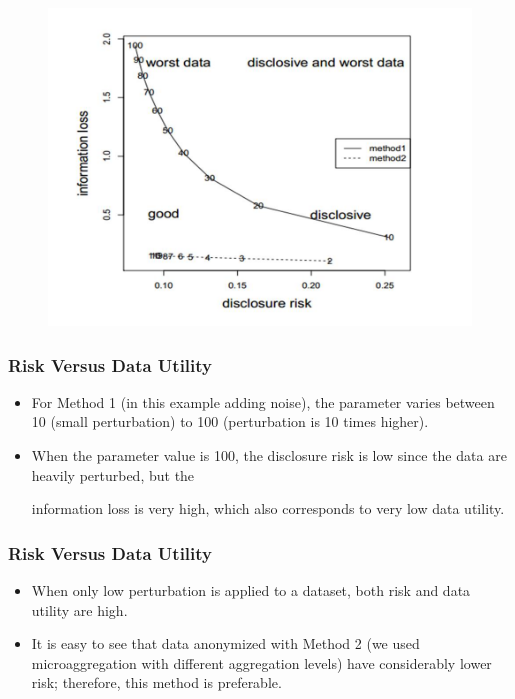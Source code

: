 \documentclass{beamer}
\begin{document}
\begin{frame}
	\begin{figure}
		\centering
		\includegraphics[width=0.99\linewidth]{JPEGS/TemplGraph1}
	\end{figure}
	
\end{frame}
\begin{frame}
	\frametitle{Risk Versus Data Utility}
	\begin{itemize}
		\item For Method 1 (in this example adding noise), the parameter varies between 10
		(small perturbation) to 100 (perturbation is 10 times higher). 
		\item When the parameter
		value is 100, the disclosure risk is low since the data are heavily perturbed, but the
		
		information loss is very high, which also corresponds to very low data utility. 
	\end{itemize}
	
\end{frame}
\begin{frame}
	\frametitle{Risk Versus Data Utility}
	\begin{itemize}
		\item When
		only low perturbation is applied to a dataset, both risk and data utility are high. 
		\item It
		is easy to see that data anonymized with Method 2 (we used microaggregation with
		different aggregation levels) have considerably lower risk; therefore, this method
		is preferable.
	\end{itemize}
\end{frame}
\end{document}
